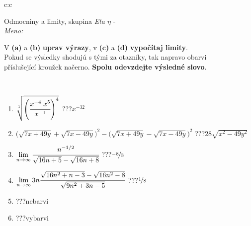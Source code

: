 \documentclass[10pt]{report}
\begin{document}
\newpage
\thispagestyle{empty}
\begin{tabular}{c:c}
\begin{minipage}[c][104.5mm][t]{0.5\linewidth}
\begin{center}
\vspace{7mm}
{\huge Odmocniny a limity, skupina \textit{Eta $\eta$} -}\\[5mm]
\textit{Meno:}\phantom{xxxxxxxxxxxxxxxxxxxxxxxxxxxxxxxxxxxxxxxxxxxxxxxxxxxxxxxxxxxxxxxxx}\\[5mm]
\begin{minipage}{0.95\linewidth}
\begin{center}
V \textbf{(a)} a \textbf{(b)} \textbf{uprav výrazy}, v \textbf{(c)} a \textbf{(d)} \textbf{vypočítaj limity}.\\Pokud se výsledky shodujú s tými za otazníky, tak napravo obarvi\\příslušející kroužek načerno. \textbf{Spolu odevzdejte výsledné slovo}.
\end{center}
\end{minipage}
\\[1mm]
\begin{minipage}{0.79\linewidth}
\begin{center}
\begin{varwidth}{\linewidth}
\begin{enumerate}
\small
\item $\sqrt[1]{\left(\cfrac{x^{-4}\;x^{5}}{x^{-1}}\right)^{4}}$\quad \dotfill\; ???\;\dotfill \quad $x^{-32}$
\item {\footnotesize{\scriptsize$\big(\sqrt{7x+49y}+\sqrt{7x-49y}\big)^2-\big(\sqrt{7x+49y}-\sqrt{7x-49y}\big)^2$}\quad \dotfill\; ???\;\dotfill \quad $28\sqrt{x^2-49y^2}$}
\item $\lim\limits_{n\to\infty}\cfrac{n^{-1/2}}{\sqrt{16n+5}-\sqrt{16n+8}}$\quad \dotfill\; ???\;\dotfill \quad $\nicefrac{-8}{3}$
\item $\lim\limits_{n\to\infty}3n\cfrac{\sqrt{16n^2+n-3}-\sqrt{16n^2-8}}{\sqrt{9n^2+3n-5}}$\quad \dotfill\; ???\;\dotfill \quad $\nicefrac{1}{8}$
\item \quad \dotfill\; ???\;\dotfill \quad nebarvi
\item \quad \dotfill\; ???\;\dotfill \quad vybarvi
\end{enumerate}
\end{varwidth}
\end{center}
\end{minipage}
\begin{minipage}{0.20\linewidth}

\end{minipage}
\end{center}
\end{minipage}
\end{tabular}
\end{document}
